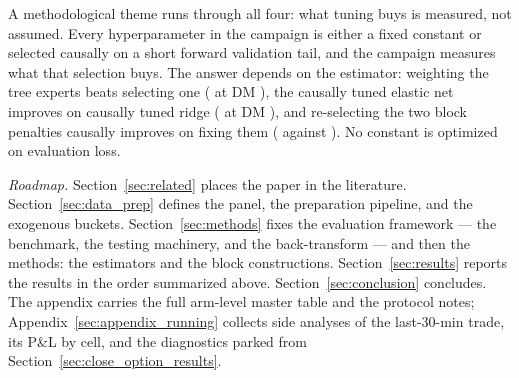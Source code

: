 A methodological theme runs through all four: what tuning buys is measured,
not assumed. Every hyperparameter in the campaign is either a fixed constant
or selected causally on a short forward validation tail, and the campaign
measures what that selection buys. The answer depends on the estimator:
weighting the tree experts beats selecting one (\unifIncrTreeHedgeDQ{} at DM
\unifIncrTreeHedgeDM{}), the causally tuned elastic net improves on causally
tuned ridge (\unifIncrBThreeEnetTunedDQ{} at DM \unifIncrBThreeEnetTunedDM{}),
and re-selecting the two block penalties causally improves on fixing them
(\unifBlkTwoTunedQLIKE{} against \unifBlkTwoUserQLIKE{}). No constant is
optimized on evaluation loss.

\emph{Roadmap.} Section~\ref{sec:related} places the paper in the
literature. Section~\ref{sec:data_prep} defines the panel, the
preparation pipeline, and the exogenous buckets.
Section~\ref{sec:methods} fixes the evaluation framework --- the
benchmark, the testing machinery, and the back-transform ---
and then the methods: the estimators and
the block constructions. Section~\ref{sec:results} reports the
results in the order summarized above.
Section~\ref{sec:conclusion} concludes. The appendix carries the full
arm-level master table and the protocol notes; Appendix~\ref{sec:appendix_running}
collects side analyses of the last-30-min trade, its P\&L by cell, and the
diagnostics parked from Section~\ref{sec:close_option_results}.
